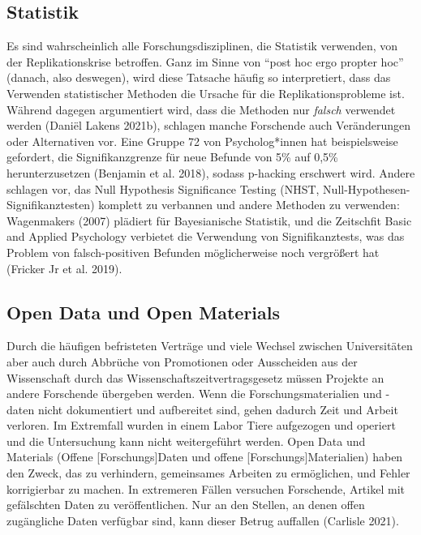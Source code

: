 \documentclass[
  letterpaper,
  DIV=11,
  numbers=noendperiod]{scrreprt}
\begin{document}
\subsection{Statistik}\label{statistik}

Es sind wahrscheinlich alle Forschungsdisziplinen, die Statistik
verwenden, von der Replikationskrise betroffen. Ganz im Sinne von ``post
hoc ergo propter hoc'' (danach, also deswegen), wird diese Tatsache
häufig so interpretiert, dass das Verwenden statistischer Methoden die
Ursache für die Replikationsprobleme ist. Während dagegen argumentiert
wird, dass die Methoden nur \emph{falsch} verwendet werden (Daniël
Lakens 2021b), schlagen manche Forschende auch Veränderungen oder
Alternativen vor. Eine Gruppe 72 von Psycholog*innen hat beispielsweise
gefordert, die Signifikanzgrenze für neue Befunde von 5\% auf 0,5\%
herunterzusetzen (Benjamin et al. 2018), sodass p-hacking erschwert
wird. Andere schlagen vor, das Null Hypothesis Significance Testing
(NHST, Null-Hypothesen-Signifikanztesten) komplett zu verbannen und
andere Methoden zu verwenden: Wagenmakers (2007) plädiert für
Bayesianische Statistik, und die Zeitschfit Basic and Applied Psychology
verbietet die Verwendung von Signifikanztests, was das Problem von
falsch-positiven Befunden möglicherweise noch vergrößert hat (Fricker Jr
et al. 2019).

\subsection{Open Data und Open
Materials}\label{open-data-und-open-materials}

Durch die häufigen befristeten Verträge und viele Wechsel zwischen
Universitäten aber auch durch Abbrüche von Promotionen oder Ausscheiden
aus der Wissenschaft durch das Wissenschaftszeitvertragsgesetz müssen
Projekte an andere Forschende übergeben werden. Wenn die
Forschungsmaterialien und -daten nicht dokumentiert und aufbereitet
sind, gehen dadurch Zeit und Arbeit verloren. Im Extremfall wurden in
einem Labor Tiere aufgezogen und operiert und die Untersuchung kann
nicht weitergeführt werden. Open Data und Materials (Offene
{[}Forschungs{]}Daten und offene {[}Forschungs{]}Materialien) haben den
Zweck, das zu verhindern, gemeinsames Arbeiten zu ermöglichen, und
Fehler korrigierbar zu machen. In extremeren Fällen versuchen
Forschende, Artikel mit gefälschten Daten zu veröffentlichen. Nur an den
Stellen, an denen offen zugängliche Daten verfügbar sind, kann dieser
Betrug auffallen (Carlisle 2021).
\end{document}
